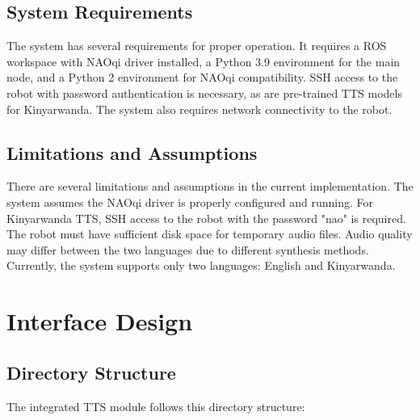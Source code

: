 \documentclass{CSSRforAfrica}
\begin{document}
\subsection{System Requirements}

The system has several requirements for proper operation. It requires a ROS workspace with NAOqi driver installed, a Python 3.9 environment for the main node, and a Python 2 environment for NAOqi compatibility. SSH access to the robot with password authentication is necessary, as are pre-trained TTS models for Kinyarwanda. The system also requires network connectivity to the robot.

\subsection{Limitations and Assumptions}

There are several limitations and assumptions in the current implementation. The system assumes the NAOqi driver is properly configured and running. For Kinyarwanda TTS, SSH access to the robot with the password "nao" is required. The robot must have sufficient disk space for temporary audio files. Audio quality may differ between the two languages due to different synthesis methods. Currently, the system supports only two languages: English and Kinyarwanda.

\newpage
\section{Interface Design}

\subsection{Directory Structure}

The integrated TTS module follows this directory structure:

\vspace{1cm}
\vspace{1cm}
\end{document}
